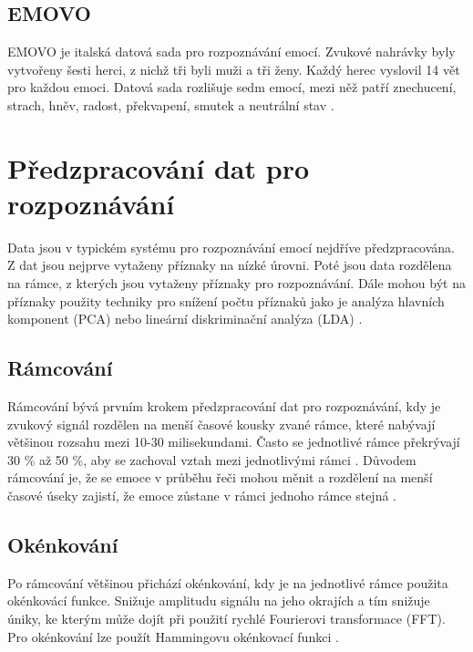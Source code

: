 \documentclass[FM,BP]{tulthesis}
\begin{document}
\subsection{EMOVO} %
EMOVO \cite{DBLP:conf/lrec/CostantiniIPT14} je italská datová sada pro rozpoznávání emocí. Zvukové nahrávky byly vytvořeny šesti herci, z nichž tři byli muži a tři ženy. Každý herec vyslovil 14 vět pro každou emoci. Datová sada rozlišuje sedm emocí, mezi něž patří znechucení, strach, hněv, radost, překvapení, smutek a neutrální stav \cite{COSTANTINI14.591}.

\section{Předzpracování dat pro rozpoznávání} %
Data jsou v typickém systému pro rozpoznávání emocí nejdříve předzpracována. Z dat jsou nejprve vytaženy příznaky na nízké úrovni. Poté jsou data rozdělena na rámce, z kterých jsou vytaženy příznaky pro rozpoznávání. Dále mohou být na příznaky použity techniky pro snížení počtu příznaků jako je analýza hlavních komponent (PCA) nebo lineární diskriminační analýza (LDA) \cite{konar_chakraborty_2015}.

\subsection{Rámcování} %
Rámcování bývá prvním krokem předzpracování dat pro rozpoznávání, kdy je zvukový signál rozdělen na menší časové kousky zvané rámce, které nabývají většinou rozsahu mezi 10-30 milisekundami. Často se jednotlivé rámce překrývají 30 \% až 50 \%, aby se zachoval vztah mezi jednotlivými rámci \cite{DBLP:journals/speech/AkcayO20}. Důvodem rámcování je, že se emoce v průběhu řeči mohou měnit a rozdělení na menší časové úseky zajistí, že emoce zůstane v rámci jednoho rámce stejná \cite{konar_chakraborty_2015}.

\subsection{Okénkování} %
Po rámcování většinou přichází okénkování, kdy je na jednotlivé rámce použita okénkovácí funkce. Snižuje amplitudu signálu na jeho okrajích a tím snižuje úniky, ke kterým může dojít při použití rychlé Fourierovi transformace (FFT). Pro okénkování lze použít Hammingovu okénkovací funkci \cite{DBLP:journals/speech/AkcayO20}.
\end{document}
